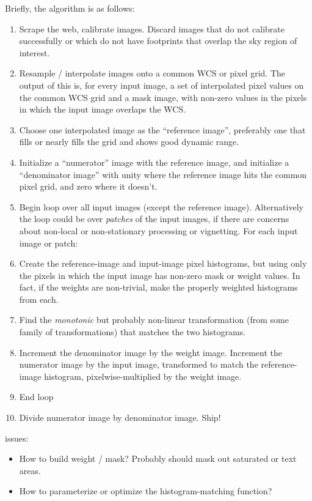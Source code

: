 \documentclass[12pt]{article}
\begin{document}
Briefly, the algorithm is as follows:
\begin{enumerate}
\item Scrape the web, calibrate images.  Discard images that do not
  calibrate successfully or which do not have footprints that overlap
  the sky region of interest.
\item Resample / interpolate images onto a common WCS or pixel grid.
  The output of this is, for every input image, a set of interpolated
  pixel values on the common WCS grid and a mask image, with non-zero
  values in the pixels in which the input image overlaps the WCS.
\item Choose one interpolated image as the ``reference image'',
  preferably one that fills or nearly fills the grid and shows good
  dynamic range.
\item Initialize a ``numerator'' image with the reference image, and
  initialize a ``denominator image'' with unity where the reference
  image hits the common pixel grid, and zero where it doesn't.
\item Begin loop over all input images (except the reference image).
  Alternatively the loop could be over \emph{patches} of the input
  images, if there are concerns about non-local or non-stationary
  processing or vignetting.  For each input image or patch:
\item Create the reference-image and input-image pixel histograms, but
  using only the pixels in which the input image has non-zero mask or
  weight values.  In fact, if the weights are non-trivial, make the
  properly weighted histograms from each.
\item Find the \emph{monotonic} but probably non-linear transformation
  (from some family of transformations) that matches the two
  histograms.
\item Increment the denominator image by the weight image.  Increment
  the numerator image by the input image, transformed to match the
  reference-image histogram, pixelwise-multiplied by the weight image.
\item End loop
\item Divide numerator image by denominator image.  Ship!
\end{enumerate}

issues:
\begin{itemize}
\item How to build weight / mask?  Probably should mask out saturated
  or text areas.
\item How to parameterize or optimize the histogram-matching function?
\end{itemize}
\end{document}
